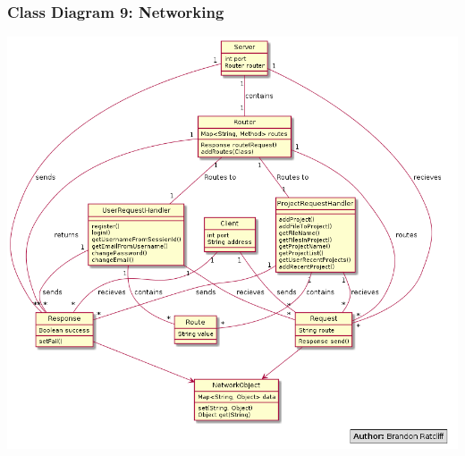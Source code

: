 \documentclass[twoside,letterpaper]{article}
\begin{document}
	\subsubsection[Class Diagram 9: Networking]{\rmfamily\bfseries\color{black}
	Class Diagram 9: Networking}
	\includegraphics[width=6.0in]{images/ClassDiagrams/Networking}
\end{document}
